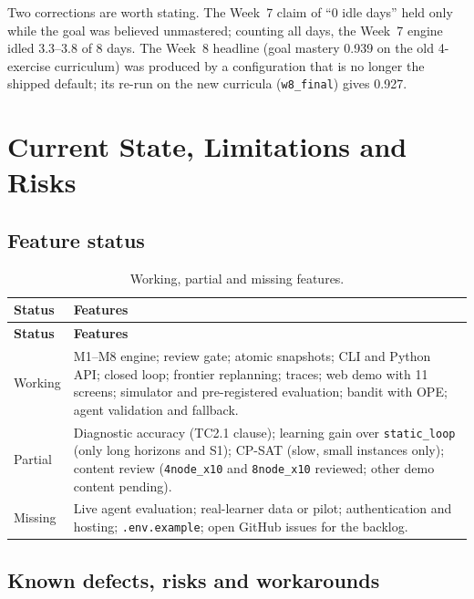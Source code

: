 \documentclass[11pt,a4paper]{article}
\begin{document}
Two corrections are worth stating. The Week~7 claim of ``0 idle days'' held only while the goal was believed unmastered; counting all days, the Week~7 engine idled 3.3--3.8 of 8 days. The Week~8 headline (goal mastery 0.939 on the old 4-exercise curriculum) was produced by a configuration that is no longer the shipped default; its re-run on the new curricula (\texttt{w8\_final}) gives 0.927.

\section{Current State, Limitations and Risks}

\subsection{Feature status}

\begin{xltabular}{\textwidth}{
    @{}
    >{\raggedright\arraybackslash}p{0.13\textwidth}
    >{\raggedright\arraybackslash}X
    @{}
}
\caption{Working, partial and missing features.}
\label{tab:status}\\
\toprule
\textbf{Status} & \textbf{Features} \\
\midrule
\endfirsthead
\toprule
\textbf{Status} & \textbf{Features} \\
\midrule
\endhead
\bottomrule
\endfoot
Working & M1--M8 engine; review gate; atomic snapshots; CLI and Python API; closed loop; frontier replanning; traces; web demo with 11 screens; simulator and pre-registered evaluation; bandit with OPE; agent validation and fallback. \\
Partial & Diagnostic accuracy (TC2.1 clause); learning gain over \texttt{static\_loop} (only long horizons and S1); CP-SAT (slow, small instances only); content review (\texttt{4node\_x10} and \texttt{8node\_x10} reviewed; other demo content pending). \\
Missing & Live agent evaluation; real-learner data or pilot; authentication and hosting; \texttt{.env.example}; open GitHub issues for the backlog. \\
\end{xltabular}

\subsection{Known defects, risks and workarounds}
\end{document}
